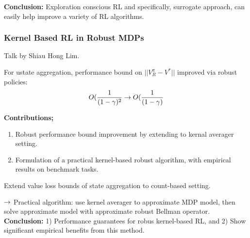 {\bf Conclusion:} Exploration conscious RL and specifically, surrogate approach, can easily help improve a variety of RL algorithms.

\spacerule

\subsubsection{Kernel Based RL in Robust MDPs}

Talk by Shiau Hong Lim. \\


For ustate aggregation, performance bound on $||V_R^\pi - V^*||$ improved via robust policies:
\[
O(\frac{1}{(1-\gamma)^2} \rightarrow O(\frac{1}{(1-\gamma)}
\]

{\bf Contributions;}
\begin{enumerate}
    \item Robust performance bound improvement by extending to kernal averager setting.
    \item Formulation of a practical kernel-based robust algorithm, with empirical results on benchmark tasks.
\end{enumerate}

\begin{theorem}
Extend value loss bounds of state aggregation to count-based setting.
\end{theorem}

$\rightarrow$ Practical algorithm: use kernel averager to approximate MDP model, then solve approximate model with approximate robust Bellman operator.\\

{\bf Conclusion:} 1) Performance guarantees for robus kernel-based RL, and 2) Show significant empirical benefits from this method.

